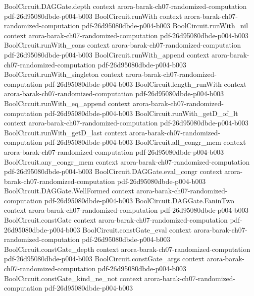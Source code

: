 \begin{theorem}
\proofstep
  {BoolCircuit.DAGGate.depth}
  {context}
  {arora-barak-ch07-randomized-computation}
  {pdf-26d95080dbde-p004-b003}
\proofstep
  {BoolCircuit.runWith}
  {context}
  {arora-barak-ch07-randomized-computation}
  {pdf-26d95080dbde-p004-b003}
\proofstep
  {BoolCircuit.runWith_nil}
  {context}
  {arora-barak-ch07-randomized-computation}
  {pdf-26d95080dbde-p004-b003}
\proofstep
  {BoolCircuit.runWith_cons}
  {context}
  {arora-barak-ch07-randomized-computation}
  {pdf-26d95080dbde-p004-b003}
\proofstep
  {BoolCircuit.runWith_append}
  {context}
  {arora-barak-ch07-randomized-computation}
  {pdf-26d95080dbde-p004-b003}
\proofstep
  {BoolCircuit.runWith_singleton}
  {context}
  {arora-barak-ch07-randomized-computation}
  {pdf-26d95080dbde-p004-b003}
\proofstep
  {BoolCircuit.length_runWith}
  {context}
  {arora-barak-ch07-randomized-computation}
  {pdf-26d95080dbde-p004-b003}
\proofstep
  {BoolCircuit.runWith_eq_append}
  {context}
  {arora-barak-ch07-randomized-computation}
  {pdf-26d95080dbde-p004-b003}
\proofstep
  {BoolCircuit.runWith_getD_of_lt}
  {context}
  {arora-barak-ch07-randomized-computation}
  {pdf-26d95080dbde-p004-b003}
\proofstep
  {BoolCircuit.runWith_getD_last}
  {context}
  {arora-barak-ch07-randomized-computation}
  {pdf-26d95080dbde-p004-b003}
\proofstep
  {BoolCircuit.all_congr_mem}
  {context}
  {arora-barak-ch07-randomized-computation}
  {pdf-26d95080dbde-p004-b003}
\proofstep
  {BoolCircuit.any_congr_mem}
  {context}
  {arora-barak-ch07-randomized-computation}
  {pdf-26d95080dbde-p004-b003}
\proofstep
  {BoolCircuit.DAGGate.eval_congr}
  {context}
  {arora-barak-ch07-randomized-computation}
  {pdf-26d95080dbde-p004-b003}
\proofstep
  {BoolCircuit.DAGGate.WellFormed}
  {context}
  {arora-barak-ch07-randomized-computation}
  {pdf-26d95080dbde-p004-b003}
\proofstep
  {BoolCircuit.DAGGate.FaninTwo}
  {context}
  {arora-barak-ch07-randomized-computation}
  {pdf-26d95080dbde-p004-b003}
\proofstep
  {BoolCircuit.constGate}
  {context}
  {arora-barak-ch07-randomized-computation}
  {pdf-26d95080dbde-p004-b003}
\proofstep
  {BoolCircuit.constGate_eval}
  {context}
  {arora-barak-ch07-randomized-computation}
  {pdf-26d95080dbde-p004-b003}
\proofstep
  {BoolCircuit.constGate_depth}
  {context}
  {arora-barak-ch07-randomized-computation}
  {pdf-26d95080dbde-p004-b003}
\proofstep
  {BoolCircuit.constGate_args}
  {context}
  {arora-barak-ch07-randomized-computation}
  {pdf-26d95080dbde-p004-b003}
\proofstep
  {BoolCircuit.constGate_kind_ne_not}
  {context}
  {arora-barak-ch07-randomized-computation}
  {pdf-26d95080dbde-p004-b003}
\proofstep

\end{theorem}
